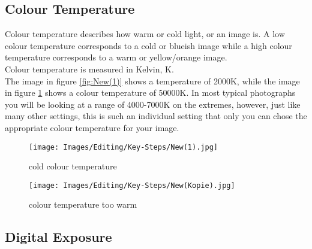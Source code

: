 \subsection{Colour Temperature}

Colour temperature describes how warm or cold light, or an image is. A low colour temperature corresponds to a cold or blueish image while a high colour temperature corresponds to a warm or yellow/orange image.
\\
Colour temperature is measured in Kelvin, K.
\\[\baselineskip]
The image in figure \ref{fig:New(1)} shows a temperature of 2000K, while the image in figure \ref{fig:New(Kopie)} shows a colour temperature of 50000K. In most typical photographs you will be looking at a range of 4000-7000K on the extremes, however, just like many other settings, this is such an individual setting that only you can chose the appropriate colour temperature for your image.

\begin{figure}[htbp]
\begin{minipage}{.5\textwidth}
	\centering
		\texttt{[image: Images/Editing/Key-Steps/New(1).jpg]}
	\caption{cold colour temperature}
	\label{fig:New(1)}
\end{minipage}
\begin{minipage}{.5\textwidth}
	\centering
		\texttt{[image: Images/Editing/Key-Steps/New(Kopie).jpg]}
	\caption{colour temperature too warm}
	\label{fig:New(Kopie)}
\end{minipage}
\end{figure}


\subsection{Digital Exposure}

